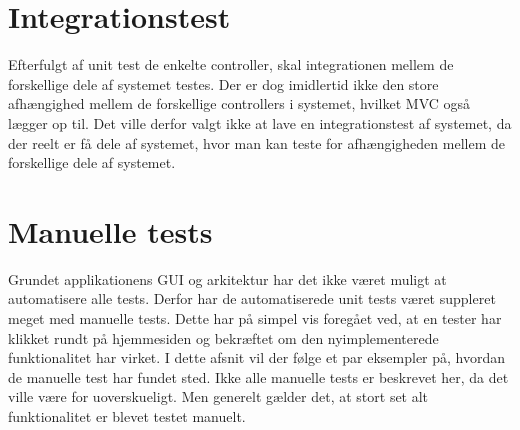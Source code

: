 \section{Integrationstest}
%
%
Efterfulgt af unit test de enkelte controller, skal integrationen mellem de forskellige dele af systemet testes. Der er dog imidlertid ikke den store afhængighed mellem de forskellige controllers i systemet, hvilket MVC også lægger op til. Det ville derfor valgt ikke at lave en integrationstest af systemet, da der reelt er få dele af systemet, hvor man kan teste for afhængigheden mellem de forskellige dele af systemet. \\

\section{Manuelle tests}
Grundet applikationens GUI og arkitektur har det ikke været muligt at automatisere alle tests. Derfor har de automatiserede unit tests været suppleret meget med manuelle tests. Dette har på simpel vis foregået ved, at en tester har klikket rundt på hjemmesiden og bekræftet om den nyimplementerede funktionalitet har virket. I dette afsnit vil der følge et par eksempler på, hvordan de manuelle test har fundet sted. Ikke alle manuelle tests er beskrevet her, da det ville være for uoverskueligt. Men generelt gælder det, at stort set alt funktionalitet er blevet testet manuelt.

